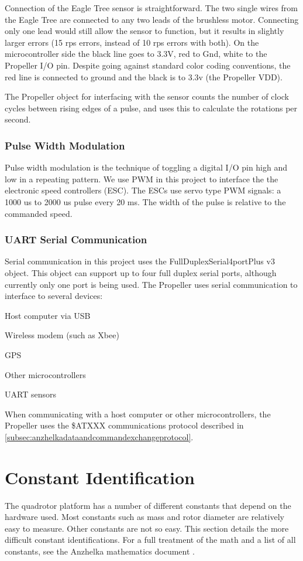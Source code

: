 \documentclass{article}
\numberwithin{equation}{section} %
\begin{document}
Connection of the Eagle Tree sensor is straightforward. The two single wires from the Eagle Tree are connected to any two leads of the brushless motor. Connecting only one lead would still allow the sensor to function, but it results in slightly larger errors (15 rps errors, instead of 10 rps errors with both). On the microcontroller side the black line goes to 3.3V, red to Gnd, white to the Propeller I/O pin. Despite going against standard color coding conventions, the red line is connected to ground and the black is to 3.3v (the Propeller VDD). 

The Propeller object for interfacing with the sensor counts the number of clock cycles between rising edges of a pulse, and uses this to calculate the rotations per second.

\subsubsection{Pulse Width Modulation}
Pulse width modulation is the technique of toggling a digital I/O pin high and low in a repeating pattern. We use PWM in this project to interface the the electronic speed controllers (ESC). The ESCs use servo type PWM signals: a 1000 us to 2000 us pulse every 20 ms. The width of the pulse is relative  to the commanded speed. 


\subsubsection{UART Serial Communication}
Serial communication in this project uses the FullDuplexSerial4portPlus v3 object. This object can support up to four full duplex serial ports, although currently only one port is being used. The Propeller uses serial communication to interface to several devices:
\begin{list}{*}{}
	\item Host computer via USB
	\item Wireless modem (such as Xbee)
	\item GPS
	\item Other microcontrollers
	\item UART sensors
\end{list}
When communicating with a host computer or other microcontrollers, the Propeller uses the \$ATXXX communications protocol described in \ref{subsec:anzhelkadataandcommandexchangeprotocol}.


\section{Constant Identification}
The quadrotor platform has a number of different constants that depend on the hardware used. Most constants such as mass and rotor diameter are relatively easy to measure. Other constants are not so easy. This section details the more difficult constant identifications. For a full treatment of the math and a list of all constants, see the Anzhelka mathematics document \cite{anzhelka_math}.
\end{document}
